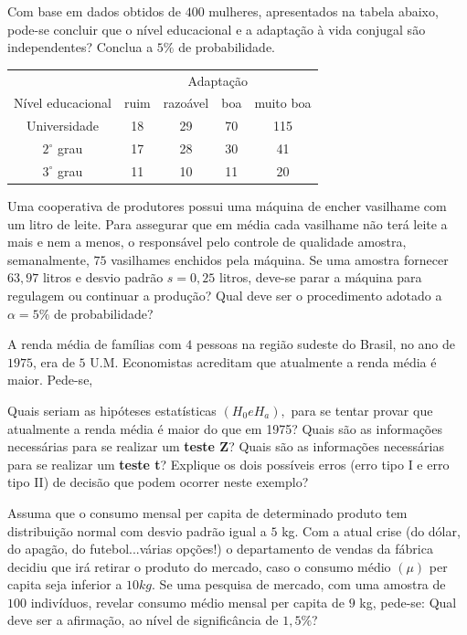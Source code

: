 \documentclass{report}
\begin{document}
\begin{Exercise}
\Question Com base em dados obtidos de $400$ mulheres, apresentados na tabela abaixo, pode-se concluir que o nível educacional e a adaptação à vida conjugal 
são independentes? Conclua a $5\%$ de probabilidade.

\begin{table}[H]
\centering
\begin{tabular}{ccccc}
\hline \hline
                                      &\multicolumn{4}{c}{Adaptação}\\
																			\cline{2-5}
Nível educacional&ruim&razoável&boa&muito boa\\
\hline\hline
         Universidade& 18  &29 & 70 & 115      \\
$2^{\circ}$ grau     & 17  &28 & 30 &    41     \\
$3^{\circ}$ grau     & 11  &10 & 11 &    20     \\
\hline
\end{tabular}
\end{table}

\Question Uma cooperativa de produtores possui uma máquina de encher vasilhame com um litro de leite. Para assegurar que em média cada vasilhame não terá 
leite a mais e nem a menos, o responsável pelo controle de qualidade amostra, semanalmente, $75$ vasilhames enchidos pela máquina. Se uma amostra fornecer 
$63,97$ litros e desvio padrão $s=0,25$ litros, deve-se parar a máquina para regulagem ou continuar a produção? Qual deve ser o procedimento adotado a $\alpha=5\%$ 
de probabilidade?

\Question A renda média de famílias com $4$ pessoas na região sudeste do Brasil, no ano de $1975$, era de $5$ U.M. Economistas acreditam que atualmente a renda 
média é maior. Pede-se,
\begin{tasks}
\task Quais seriam as hipóteses estatísticas $(H_{0} e H_{a}),$ para se tentar provar que atualmente a renda média é maior do que em 1975?
\task Quais são as informações necessárias para se realizar um \textbf{teste Z}?
\task Quais são as informações necessárias para se realizar um \textbf{teste t}?
\task Explique os dois possíveis erros (erro tipo I e erro tipo II) de decisão que podem ocorrer neste exemplo?
\end{tasks}

\Question Assuma que o consumo mensal per capita de determinado produto tem distribuição normal com desvio padrão igual a $5$ kg. Com a atual crise (do dólar, 
do apagão, do futebol...várias opções!) o departamento de vendas da fábrica decidiu que irá retirar o produto do mercado, caso o consumo médio $(\mu)$ per capita 
seja inferior a $10 kg.$ Se uma pesquisa de mercado, com uma amostra de $100$ indivíduos, revelar consumo médio mensal per capita de $9$ kg, pede-se: Qual deve 
ser a afirmação, ao nível de significância de $1,5\%$?


\end{Exercise}
\end{document}
